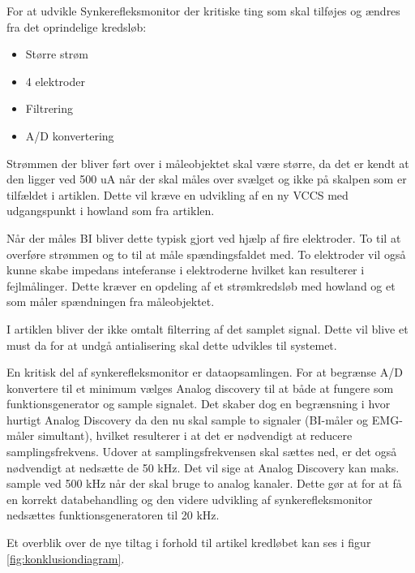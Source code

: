For at udvikle Synkerefleksmonitor der kritiske ting som skal tilføjes og ændres fra det oprindelige kredsløb:
\begin{itemize}
\item Større strøm
\item 4 elektroder
\item Filtrering
\item A/D konvertering
\end{itemize}

Strømmen der bliver ført over i måleobjektet skal være større, da det er kendt at den ligger ved 500 uA\cite{Kusuhara2004} når der skal måles over svælget og ikke på skalpen som er tilfældet i artiklen. Dette vil kræve en udvikling af en ny VCCS med udgangspunkt i howland som fra artiklen.

Når der måles BI bliver dette typisk gjort ved hjælp af fire elektroder\cite{Brantlov2017}. To til at overføre strømmen og to til at måle spændingsfaldet med. To elektroder vil også kunne skabe impedans inteferanse i elektroderne hvilket kan resulterer i fejlmålinger. Dette kræver en opdeling af et strømkredsløb med howland og et som måler spændningen fra måleobjektet.

I artiklen bliver der ikke omtalt filterring af det samplet signal. Dette vil blive et must da for at undgå antialisering\cite{Thomas2011} skal dette udvikles til systemet.


En kritisk del af synkerefleksmonitor er dataopsamlingen. For at begrænse A/D konvertere til et minimum vælges Analog discovery til at både at fungere som funktionsgenerator og sample signalet. Det skaber dog en begrænsning i hvor hurtigt Analog Discovery da den nu skal sample to signaler (BI-måler og EMG-måler simultant), hvilket resulterer i at det er nødvendigt at reducere samplingsfrekvens. Udover at samplingsfrekvensen skal sættes ned, er det også nødvendigt at nedsætte de 50 kHz. Det vil sige at Analog Discovery kan maks. sample ved 500 kHz når der skal bruge to analog kanaler. Dette gør at for at få en korrekt databehandling og den videre udvikling af synkerefleksmonitor nedsættes funktionsgeneratoren til 20 kHz.

Et overblik over de nye tiltag i forhold til artikel kredløbet kan ses i figur \ref{fig:konklusiondiagram}. 



